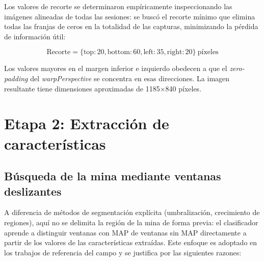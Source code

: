 Los valores de recorte se determinaron empíricamente inspeccionando las imágenes
alineadas de todas las sesiones: se buscó el recorte mínimo que elimina todas
las franjas de ceros en la totalidad de las capturas, minimizando la pérdida de
información útil:

\begin{equation}
  \text{Recorte} = \{\text{top}: 20, \text{bottom}: 60, \text{left}: 35, \text{right}: 20\}\ \text{píxeles}
  \label{eq:crop}
\end{equation}

Los valores mayores en el margen inferior e izquierdo obedecen a que el
\textit{zero-padding} del \textit{warpPerspective} se concentra en esas
direcciones. La imagen resultante tiene dimensiones aproximadas de
1185$\times$840 píxeles.

\section{Etapa 2: Extracción de características}

\subsection{Búsqueda de la mina mediante ventanas deslizantes}
\label{sec:extraccion_parches}

A diferencia de métodos de segmentación explícita (umbralización, crecimiento
de regiones), aquí no se delimita la región de la mina de forma previa: el
clasificador aprende a distinguir ventanas con MAP de ventanas sin MAP
directamente a partir de los valores de las características extraídas. Este
enfoque es adoptado en los trabajos de referencia del campo
\cite{clark2000, silva2019} y se justifica por las siguientes razones:

